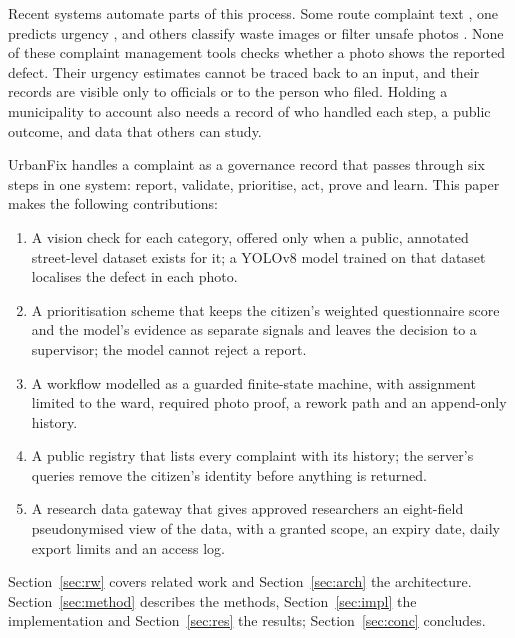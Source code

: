 \documentclass[conference]{IEEEtran}
\begin{document}
Recent systems automate parts of this process. Some route complaint text \cite{citiwatch,smartcity}, one predicts urgency \cite{cholke}, and others classify waste images \cite{regenx} or filter unsafe photos \cite{civicmate}. None of these complaint management tools checks whether a photo shows the reported defect. Their urgency estimates cannot be traced back to an input, and their records are visible only to officials or to the person who filed. Holding a municipality to account also needs a record of who handled each step, a public outcome, and data that others can study.

UrbanFix handles a complaint as a governance record that passes through six steps in one system: report, validate, prioritise, act, prove and learn. This paper makes the following contributions:
\begin{enumerate}
\item A vision check for each category, offered only when a public, annotated street-level dataset exists for it; a YOLOv8 model \cite{yolov8} trained on that dataset localises the defect in each photo.
\item A prioritisation scheme that keeps the citizen's weighted questionnaire score and the model's evidence as separate signals and leaves the decision to a supervisor; the model cannot reject a report.
\item A workflow modelled as a guarded finite-state machine, with assignment limited to the ward, required photo proof, a rework path and an append-only history.
\item A public registry that lists every complaint with its history; the server's queries remove the citizen's identity before anything is returned.
\item A research data gateway that gives approved researchers an eight-field pseudonymised view of the data, with a granted scope, an expiry date, daily export limits and an access log.
\end{enumerate}

Section~\ref{sec:rw} covers related work and Section~\ref{sec:arch} the architecture. Section~\ref{sec:method} describes the methods, Section~\ref{sec:impl} the implementation and Section~\ref{sec:res} the results; Section~\ref{sec:conc} concludes.

\end{document}

